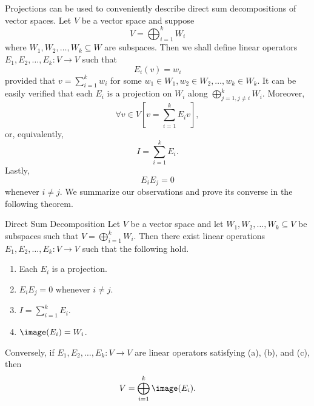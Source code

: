 \documentclass[linearalgebraII]{subfiles}
\begin{document}
    \begin{remark}
        Projections can be used to conveniently describe direct sum decompositions of vector spaces. Let $V$ be a vector space and suppose
        \begin{equation*}
            V = \bigoplus^{k}_{i=1} W_i
        \end{equation*}
        where $W_1, W_2, \ldots, W_k\subseteq W$ are subspaces. Then we shall define linear operators $E_1, E_2, \ldots, E_k:V\to V$ such that
        \begin{equation*}
            E_i(v) = w_i
        \end{equation*}
        provided that $v = \sum^{k}_{i=1} w_i$ for some $w_1\in W_1, w_2\in W_2, \ldots, w_k\in W_k$. It can be easily verified that each $E_i$ is a projection on $W_i$ along $\bigoplus^{k}_{j=1, j\neq i} W_i$. Moreover,
        \begin{equation*}
            \forall v\in V \left[ v = \sum^{k}_{i=1} E_iv \right],
        \end{equation*}
        or, equivalently,
        \begin{equation*}
            I = \sum^{k}_{i=1} E_i. 
        \end{equation*}
        Lastly,
        \begin{equation*}
            E_iE_j = 0
        \end{equation*}
        whenever $i\neq j$. We summarize our observations and prove its converse in the following theorem.
    \end{remark}

    \clearpage
    \begin{theorem}{Direct Sum Decomposition}
        Let $V$ be a vector space and let $W_1, W_2, \ldots, W_k\subseteq V$ be subspaces such that $V = \bigoplus^{k}_{i=1} W_i$. Then there exist linear operations $E_1, E_2, \ldots, E_k:V\to V$ such that the following hold.
        \begin{enumerate}
            \item Each $E_i$ is a projection.
            \item $E_iE_j = 0$ whenever $i\neq j$. 
            \item $I = \sum^{k}_{i=1} E_i$.
            \item $\image(E_i) = W_i$.
        \end{enumerate}
        Conversely, if $E_1, E_2, \ldots, E_k:V\to V$ are linear operators satisfying (a), (b), and (c), then
        \begin{equation*}
            V = \bigoplus^{k}_{i=1} \image(E_i).
        \end{equation*}
    \end{theorem}
\end{document}
